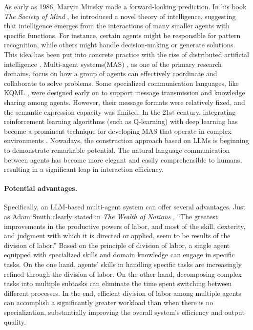  As early as 1986, Marvin Minsky made a forward-looking prediction. In his book \textit{The Society of Mind} \cite{minsky1988society}, he introduced a novel theory of intelligence, suggesting that intelligence emerges from the interactions of many smaller agents with specific functions. For instance, certain agents might be responsible for pattern recognition, while others might handle decision-making or generate solutions. This idea has been put into concrete practice with the rise of distributed artificial intelligence \cite{balaji2010introduction}. Multi-agent systems(MAS) \cite{DBLP:journals/ker/WooldridgeJ95}, as one of the primary research domains, focus on how a group of agents can effectively coordinate and collaborate to solve problems. Some specialized communication languages, like KQML \cite{DBLP:conf/cikm/FininFMM94}, were designed early on to support message transmission and knowledge sharing among agents. However, their message formats were relatively fixed, and the semantic expression capacity was limited. In the 21st century, integrating reinforcement learning algorithms (such as Q-learning) with deep learning has become a prominent technique for developing MAS that operate in complex environments \cite{yang2020overview}. Nowadays, the construction approach based on LLMs is beginning to demonstrate remarkable potential. The natural language communication between agents has become more elegant and easily comprehensible to humans, resulting in a significant leap in interaction efficiency.

\paragraph{Potential advantages.}
Specifically, an LLM-based multi-agent system can offer several advantages. Just as Adam Smith clearly stated in \textit{The Wealth of Nations} \cite{smith1937wealth}, ``The greatest improvements in the productive powers of labor, and most of the skill, dexterity, and judgment with which it is directed or applied, seem to be results of the division of labor.'' Based on the principle of division of labor, a single agent equipped with specialized skills and domain knowledge can engage in specific tasks. On the one hand, agents' skills in handling specific tasks are increasingly refined through the division of labor. On the other hand, decomposing complex tasks into multiple subtasks can eliminate the time spent switching between different processes. In the end, efficient division of labor among multiple agents can accomplish a significantly greater workload than when there is no specialization, substantially improving the overall system's efficiency and output quality.

